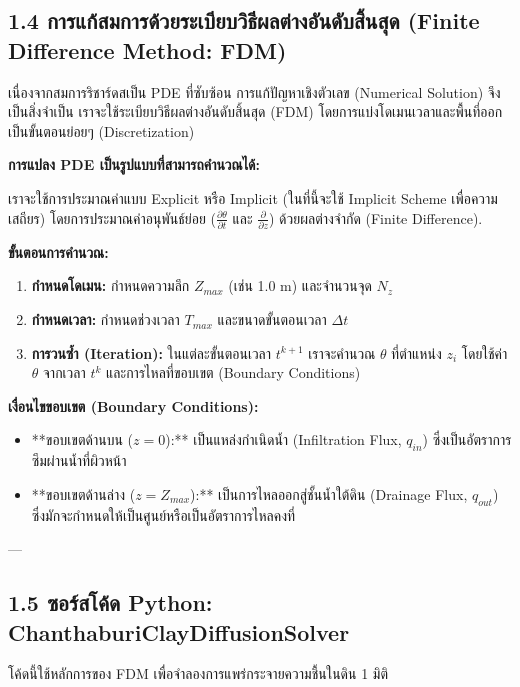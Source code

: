 \documentclass[11pt,a4paper,openany]{report}
\begin{document}
\subsection{1.4 การแก้สมการด้วยระเบียบวิธีผลต่างอันดับสิ้นสุด (Finite Difference Method: FDM)}


เนื่องจากสมการริชาร์ดสเป็น PDE ที่ซับซ้อน การแก้ปัญหาเชิงตัวเลข (Numerical Solution) จึงเป็นสิ่งจำเป็น เราจะใช้ระเบียบวิธีผลต่างอันดับสิ้นสุด (FDM) โดยการแบ่งโดเมนเวลาและพื้นที่ออกเป็นขั้นตอนย่อยๆ (Discretization)

\textbf{การแปลง PDE เป็นรูปแบบที่สามารถคำนวณได้:}

เราจะใช้การประมาณค่าแบบ Explicit หรือ Implicit (ในที่นี้จะใช้ Implicit Scheme เพื่อความเสถียร) โดยการประมาณค่าอนุพันธ์ย่อย ($\frac{\partial \theta}{\partial t}$ และ $\frac{\partial}{\partial z}$) ด้วยผลต่างจำกัด (Finite Difference).

\textbf{ขั้นตอนการคำนวณ:}

\begin{enumerate}
  \item \textbf{กำหนดโดเมน:} กำหนดความลึก $Z_{max}$ (เช่น 1.0 $\text{m}$) และจำนวนจุด $N_z$
  \item \textbf{กำหนดเวลา:} กำหนดช่วงเวลา $T_{max}$ และขนาดขั้นตอนเวลา $\Delta t$
  \item \textbf{การวนซ้ำ (Iteration):} ในแต่ละขั้นตอนเวลา $t^{k+1}$ เราจะคำนวณ $\theta$ ที่ตำแหน่ง $z_i$ โดยใช้ค่า $\theta$ จากเวลา $t^k$ และการไหลที่ขอบเขต (Boundary Conditions)
\end{enumerate}


\textbf{เงื่อนไขขอบเขต (Boundary Conditions):}
\begin{itemize}
  \item **ขอบเขตด้านบน ($z=0$):** เป็นแหล่งกำเนิดน้ำ (Infiltration Flux, $q_{in}$) ซึ่งเป็นอัตราการซึมผ่านน้ำที่ผิวหน้า
  \item **ขอบเขตด้านล่าง ($z=Z_{max}$):** เป็นการไหลออกสู่ชั้นน้ำใต้ดิน (Drainage Flux, $q_{out}$) ซึ่งมักจะกำหนดให้เป็นศูนย์หรือเป็นอัตราการไหลคงที่
\end{itemize}


---

\subsection{1.5 ซอร์สโค้ด Python: ChanthaburiClayDiffusionSolver}


โค้ดนี้ใช้หลักการของ FDM เพื่อจำลองการแพร่กระจายความชื้นในดิน 1 มิติ
\end{document}
